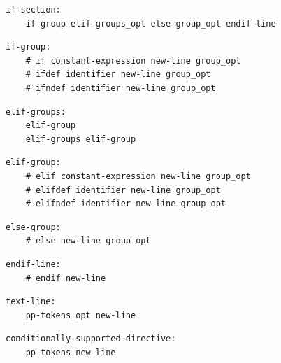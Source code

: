 \noindent\textbf{\texttt{}}\par
\begin{lstlisting}
if-section:
    if-group elif-groups_opt else-group_opt endif-line
\end{lstlisting}

\noindent\textbf{\texttt{}}\par
\begin{lstlisting}
if-group:
    # if constant-expression new-line group_opt
    # ifdef identifier new-line group_opt
    # ifndef identifier new-line group_opt
\end{lstlisting}

\noindent\textbf{\texttt{}}\par
\begin{lstlisting}
elif-groups:
    elif-group
    elif-groups elif-group
\end{lstlisting}

\noindent\textbf{\texttt{}}\par
\begin{lstlisting}
elif-group:
    # elif constant-expression new-line group_opt
    # elifdef identifier new-line group_opt
    # elifndef identifier new-line group_opt
\end{lstlisting}

\noindent\textbf{\texttt{}}\par
\begin{lstlisting}
else-group:
    # else new-line group_opt
\end{lstlisting}

\noindent\textbf{\texttt{}}\par
\begin{lstlisting}
endif-line:
    # endif new-line
\end{lstlisting}

\noindent\textbf{\texttt{}}\par
\begin{lstlisting}
text-line:
    pp-tokens_opt new-line
\end{lstlisting}

\noindent\textbf{\texttt{}}\par
\begin{lstlisting}
conditionally-supported-directive:
    pp-tokens new-line
\end{lstlisting}

